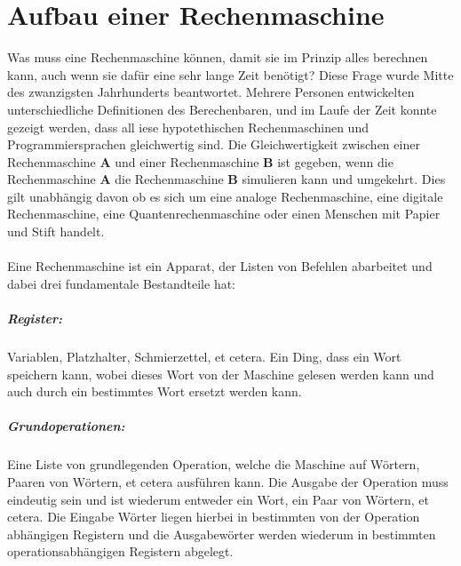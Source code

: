 \documentclass[11pt,a4paper,leqno]{report}
\numberwithin{equation}{chapter}
\begin{document}
\chapter{Aufbau einer Rechenmaschine}
Was muss eine Rechenmaschine können, damit sie im Prinzip alles berechnen kann, auch wenn sie dafür eine sehr lange Zeit benötigt? Diese Frage wurde Mitte des zwanzigsten Jahrhunderts beantwortet. Mehrere Personen entwickelten unterschiedliche Definitionen des Berechenbaren, und im Laufe der Zeit konnte gezeigt werden, dass all 
iese hypotethischen Rechenmaschinen und Programmiersprachen gleichwertig sind. Die Gleichwertigkeit zwischen einer Rechenmaschine \textbf{A} und einer Rechenmaschine \textbf{B} ist gegeben, wenn die\\ Rechenmaschine \textbf{A} die Rechenmaschine \textbf{B} simulieren kann und umgekehrt. Dies gilt unabhängig davon ob es sich um eine analoge Rechenmaschine, eine digitale Rechenmaschine, eine Quantenrechenmaschine oder einen Menschen mit Papier und Stift handelt.\\
\\
Eine Rechenmaschine ist ein Apparat, der Listen von Befehlen abarbeitet und dabei drei fundamentale Bestandteile hat:
\paragraph{Register:} Variablen, Platzhalter, Schmierzettel, et cetera. Ein Ding, dass ein Wort speichern kann, wobei dieses Wort von der Maschine gelesen werden kann und auch durch ein bestimmtes Wort ersetzt werden kann.
\paragraph{Grundoperationen:} Eine Liste von grundlegenden Operation, welche die Maschine auf Wörtern, Paaren von Wörtern, et cetera ausführen kann. Die Ausgabe der Operation muss eindeutig sein und ist wiederum entweder ein Wort, ein Paar von Wörtern, et cetera. Die Eingabe Wörter liegen hierbei in bestimmten von der Operation abhängigen Registern und die Ausgabewörter werden wiederum in bestimmten operationsabhängigen Registern abgelegt.
\end{document}
